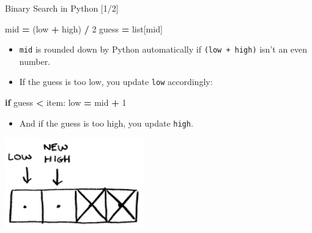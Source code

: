\documentclass[ignorenonframetext,]{beamer}
\newenvironment{Shaded}{\begin{snugshade}}{\end{snugshade}}
\newcommand{\BuiltInTok}[1]{#1}
\newcommand{\ControlFlowTok}[1]{\textcolor[rgb]{0.13,0.29,0.53}{\textbf{#1}}}
\newcommand{\DecValTok}[1]{\textcolor[rgb]{0.00,0.00,0.81}{#1}}
\newcommand{\NormalTok}[1]{#1}
\newcommand{\OperatorTok}[1]{\textcolor[rgb]{0.81,0.36,0.00}{\textbf{#1}}}
\providecommand{\tightlist}{%
  \setlength{\itemsep}{0pt}\setlength{\parskip}{0pt}}
\begin{document}
\begin{frame}[fragile]{Binary Search in Python {[}1/2{]}}
\begin{Shaded}
\begin{Highlighting}[]
\NormalTok{mid }\OperatorTok{=}\NormalTok{ (low }\OperatorTok{+}\NormalTok{ high) }\OperatorTok{/} \DecValTok{2}
\NormalTok{guess }\OperatorTok{=} \BuiltInTok{list}\NormalTok{[mid]}
\end{Highlighting}
\end{Shaded}

\begin{itemize}
\tightlist
\item
  \texttt{mid} is rounded down by Python automatically if
  \texttt{(low\ +\ high)} isn't an even number.
\item
  If the guess is too low, you update \texttt{low} accordingly:
\end{itemize}

\begin{Shaded}
\begin{Highlighting}[]
\ControlFlowTok{if}\NormalTok{ guess }\OperatorTok{<}\NormalTok{ item:}
\NormalTok{  low }\OperatorTok{=}\NormalTok{ mid }\OperatorTok{+} \DecValTok{1}
\end{Highlighting}
\end{Shaded}

\begin{itemize}
\tightlist
\item
  And if the guess is too high, you update \texttt{high}.
\end{itemize}

\includegraphics{./Chapter01-figure/array_binary_search_02.png}

\end{frame}
\end{document}
